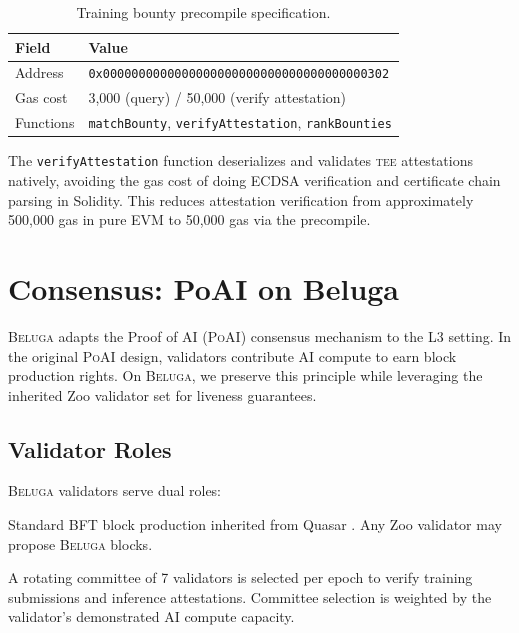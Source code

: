 \documentclass[11pt,letterpaper]{article}
\newcommand{\Beluga}{\textsc{Beluga}}
\newcommand{\PoAI}{\textsc{PoAI}}
\newcommand{\TEE}{\textsc{tee}}
\begin{document}
\begin{table}[h]
\centering
\caption{Training bounty precompile specification.}
\label{tab:precompile-0302}
\begin{tabular}{@{}ll@{}}
\toprule
Field & Value \\
\midrule
Address & \texttt{0x0000000000000000000000000000000000000302} \\
Gas cost & 3,000 (query) / 50,000 (verify attestation) \\
Functions & \texttt{matchBounty}, \texttt{verifyAttestation}, \texttt{rankBounties} \\
\bottomrule
\end{tabular}
\end{table}

The \texttt{verifyAttestation} function deserializes and validates \TEE{} attestations natively, avoiding the gas cost of doing ECDSA verification and certificate chain parsing in Solidity. This reduces attestation verification from approximately 500,000 gas in pure EVM to 50,000 gas via the precompile.

\section{Consensus: PoAI on Beluga}\label{sec:consensus}

\Beluga{} adapts the Proof of AI (\PoAI{}) consensus mechanism \cite{zoo-poai} to the L3 setting. In the original \PoAI{} design, validators contribute AI compute to earn block production rights. On \Beluga{}, we preserve this principle while leveraging the inherited Zoo validator set for liveness guarantees.

\subsection{Validator Roles}

\Beluga{} validators serve dual roles:

\begin{description}[nosep]
    \item[Block production] Standard BFT block production inherited from Quasar \cite{lux-quasar}. Any Zoo validator may propose \Beluga{} blocks.
    \item[AI verification] A rotating committee of 7 validators is selected per epoch to verify training submissions and inference attestations. Committee selection is weighted by the validator's demonstrated AI compute capacity.
\end{description}
\end{document}
